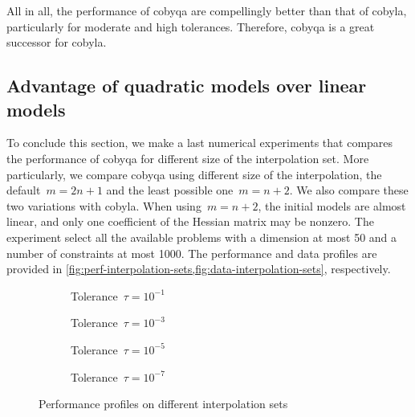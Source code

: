 All in all, the performance of \gls{cobyqa} are compellingly better than that of \gls{cobyla}, particularly for moderate and high tolerances.
Therefore, \gls{cobyqa} is a great successor for \gls{cobyla}.

\subsection{Advantage of quadratic models over linear models}

To conclude this section, we make a last numerical experiments that compares the performance of \gls{cobyqa} for different size of the interpolation set.
More particularly, we compare \gls{cobyqa} using different size of the interpolation, the default~$m = 2n + 1$ and the least possible one~$m = n + 2$.
We also compare these two variations with \gls{cobyla}.
When using~$m = n + 2$, the initial models are almost linear, and only one coefficient of the Hessian matrix may be nonzero.
The experiment select all the available problems with a dimension at most \num{50} and a number of constraints at most \num[group-minimum-digits=4]{1000}.
The performance and data profiles are provided in \cref{fig:perf-interpolation-sets,fig:data-interpolation-sets}, respectively.

\begin{figure}[ht]
    \centering
    \begin{subfigure}[b]{0.49\textwidth}
        \centering
        \caption{Tolerance~$\tau = 10^{-1}$}
    \end{subfigure}
    \hfill
    \begin{subfigure}[b]{0.49\textwidth}
        \centering
        \caption{Tolerance~$\tau = 10^{-3}$}
    \end{subfigure}
    \begin{subfigure}[b]{0.49\textwidth}
        \centering
        \caption{Tolerance~$\tau = 10^{-5}$}
    \end{subfigure}
    \hfill
    \begin{subfigure}[b]{0.49\textwidth}
        \centering
        \caption{Tolerance~$\tau = 10^{-7}$}
    \end{subfigure}
    \caption{Performance profiles on different interpolation sets}
    \label{fig:perf-interpolation-sets}
\end{figure}

